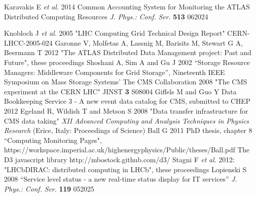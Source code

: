 \begin{thebibliography}{1}

Karavakis E {\it et al.}  2014 Common Accounting System for Monitoring the ATLAS 
Distributed Computing Resources
{\it J. Phys.: Conf. Ser.} {\bf 513} 062024

 Knobloch J {\it et al.} 2005 "LHC Computing Grid Technical Design Report" CERN-LHCC-2005-024
 Garonne V, Molfetas A, Lassnig M, Barisits M, Stewart G A, Beermann T 2012 "The ATLAS Distributed Data Management project: Past and Future", these proceedings
 Shoshani A,  Sim A and  Gu J 2002 ``Storage Resource Managers: Middleware Components for Grid Storage'',  Nineteenth IEEE Symposium on Mass Storage Systems'
 The CMS Collaboration 2008 "The CMS experiment at the CERN LHC" JINST {\bf 3} S08004
 Giffels M and Guo Y Data Bookkeeping Service 3 - A new event data catalog for CMS, submitted to CHEP 2012
 Egeland R, Wildish T and Metson S 2008 "Data transfer infrastructure for CMS data taking" {\it XII Advanced Computing and Analysis Techniques in Physics Research} (Erice, Italy: Proceedings of Science)
 Ball G 2011 PhD thesis, chapter 8 ``Computing Monitoring Pages",
 https://workspace.imperial.ac.uk/highenergyphysics/Public/theses/Ball.pdf
 The D3 javascript library http://mbostock.github.com/d3/
 Stagni F {\it et al.} 2012: "LHCbDIRAC: distributed computing in LHCb",  these proceedings 
 Lopienski S 2008 ``Service level status - a new real-time status display for IT services'' {\it J. Phys.: Conf. Ser.}  {\bf 119} 052025



\end{thebibliography}
